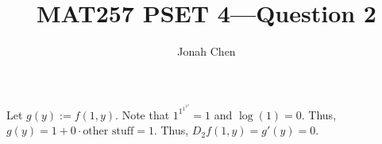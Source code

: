 \documentclass{exam}
\title{MAT257 PSET 4---Question 2}
\author{Jonah Chen}
\numberwithin{equation}{section}
\begin{document}
    \sffamily
    \maketitle
    Let $g(y):=f(1,y)$. Note that $1^{1^{1^{1^y}}}=1$ and $\log(1)=0$. Thus, $g(y)=1+0\cdot \text{other stuff}=1$. Thus, $D_2f(1,y)=g'(y)=0$.
\end{document}
